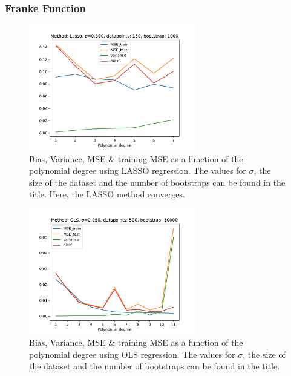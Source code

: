 \documentclass[11pt,a4paper,titlepage]{article}
\begin{document}
\subsubsection{Franke Function}
\begin{figure}[H]
\centering
\includegraphics[width=0.65\textwidth]{Bias_Variance_LASSO.pdf}
\caption[Bias, Variance, MSE \& training MSE as a function of the polynomial degree using LASSO regression]{Bias, Variance, MSE \& training MSE as a function of the polynomial degree using LASSO regression. The values for $\sigma$, the size of the dataset and the number of bootstraps can be found in the title. Here, the LASSO method converges.}
\label{fig:LASSO_Bias_Variance}
\end{figure}
\begin{figure}[H]
\centering
\includegraphics[width=0.65\textwidth]{Bias_Variance_OLS.pdf}
\caption[Bias, Variance, MSE \& training MSE as a function of the polynomial degree using OLS regression]{Bias, Variance, MSE \& training MSE as a function of the polynomial degree using OLS regression. The values for $\sigma$, the size of the dataset and the number of bootstraps can be found in the title.}
\label{fig:Bias_Variance}
\end{figure}
\end{document}
